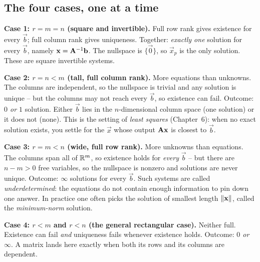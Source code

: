 \subsection{The four cases, one at a time}

\textbf{Case 1: $r=m=n$ (square and invertible).} Full row rank gives existence for every
$\vec{b}$; full column rank gives uniqueness. Together: \emph{exactly one} solution for
every $\vec{b}$, namely $\mathbf{x}=\mathbf{A}^{-1}\mathbf{b}$. The nullspace is $\{\vec 0\}$, so
$\vec{x}_p$ is the only solution. These are square invertible systems.

\textbf{Case 2: $r=n<m$ (tall, full column rank).} More equations than unknowns. The
columns are independent, so the nullspace is trivial and any solution is unique -- but the
columns may not reach every $\vec b$, so existence can fail. Outcome: \emph{$0$ or $1$}
solution. Either $\vec{b}$ lies in the $n$-dimensional column space (one solution) or it
does not (none). This is the setting of \emph{least squares} (Chapter~6): when no exact
solution exists, you settle for the $\vec{x}$ whose output $\mathbf{A}\mathbf{x}$ is closest to
$\vec{b}$.

\textbf{Case 3: $r=m<n$ (wide, full row rank).} More unknowns than equations. The columns
span all of $\mathbb{R}^m$, so existence holds for \emph{every} $\vec{b}$ -- but there are
$n-m>0$ free variables, so the nullspace is nonzero and solutions are never unique.
Outcome: \emph{$\infty$} solutions for every $\vec{b}$. Such systems are called
\emph{underdetermined}: the equations do not contain enough information to pin down one
answer. In practice one often picks the solution of smallest length $\lVert\mathbf{x}\rVert$,
called the \emph{minimum-norm} solution.

\textbf{Case 4: $r<m$ and $r<n$ (the general rectangular case).} Neither full. Existence
can fail \emph{and} uniqueness fails whenever existence holds. Outcome: \emph{$0$ or
$\infty$}. A matrix lands here exactly when both its rows and its columns are dependent.

